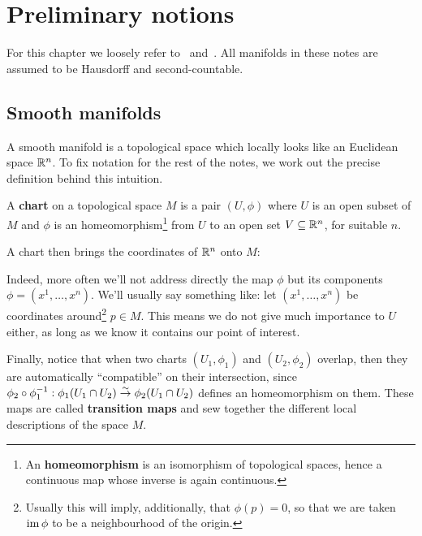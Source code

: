 \documentclass[main.tex]{subfiles}
\begin{document}
\chapter{Preliminary notions}
For this chapter we loosely refer to~\cite{abate2011geometria} and~\cite{nakahara2002}. All manifolds in these notes are assumed to be Hausdorff and second-countable.

\section{Smooth manifolds}
A smooth manifold is a topological space which locally looks like an Euclidean space $\mathbb{R}^n$. To fix notation for the rest of the notes, we work out the precise definition behind this intuition.

\begin{definition}
	A \textbf{chart} on a topological space $M$ is a pair $(U, \phi)$ where $U$ is an open subset of $M$ and $\phi$ is an homeomorphism\footnote{An \textbf{homeomorphism} is an isomorphism of topological spaces, hence a continuous map whose inverse is again continuous.} from $U$ to an open set $V \subseteq \mathbb{R}^n$, for suitable $n$.
\end{definition}

A chart then brings the coordinates of $\mathbb{R}^n$ onto $M$:

\begin{figure}[H]
	\centering
\end{figure}

Indeed, more often we'll not address directly the map $\phi$ but its components $\phi = (x^1, \ldots, x^n)$. We'll usually say something like: let $(x^1, \ldots, x^n)$ be coordinates around\footnote{Usually this will imply, additionally, that $\phi(p) = 0$, so that we are taken $\operatorname{im} \phi$ to be a neighbourhood of the origin.} $p \in M$. This means we do not give much importance to $U$ either, as long as we know it contains our point of interest.

Finally, notice that when two charts $(U_1, \phi_1)$ and $(U_2, \phi_2)$ overlap, then they are automatically ``compatible'' on their intersection, since $\phi_2 \circ \phi_1^{-1} : \phi_1(U_1 \cap U_2) \overset{\sim}\to \phi_2(U_1 \cap U_2)$ defines an homeomorphism on them. These maps are called \textbf{transition maps} and sew together the different local descriptions of the space $M$.
\end{document}
